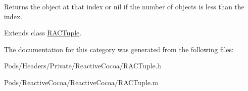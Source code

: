 Returns the object at that index or nil if the number of objects is less than the index. 

Extends class \mbox{\hyperlink{interface_r_a_c_tuple_ad2360332f752318fc924727c17eb67c9}{R\+A\+C\+Tuple}}.



The documentation for this category was generated from the following files\+:\begin{DoxyCompactItemize}
\item 
Pods/\+Headers/\+Private/\+Reactive\+Cocoa/R\+A\+C\+Tuple.\+h\item 
Pods/\+Reactive\+Cocoa/\+Reactive\+Cocoa/R\+A\+C\+Tuple.\+m\end{DoxyCompactItemize}
